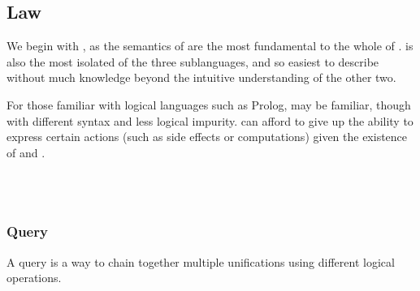 \subsection{Law}

We begin with \Law{}, as the semantics of \Law{} are the most fundamental to
the whole of \Trilogy{}. \Law{} is also the most isolated of the three
sublanguages, and so easiest to describe without much knowledge beyond
the intuitive understanding of the other two.

For those familiar with logical languages such as Prolog, \Law{} may be
familiar, though with different syntax and less logical impurity. \Law{} can
afford to give up the ability to express certain actions (such as side effects
or computations) given the existence of \Prose{} and \Poetry{}.

\begin{bnf*}
     \\
     \\
\end{bnf*}

\subsubsection{Query}

A query is a way to chain together multiple unifications using different
logical operations.

\begin{bnf*}
     \\
\end{bnf*}

